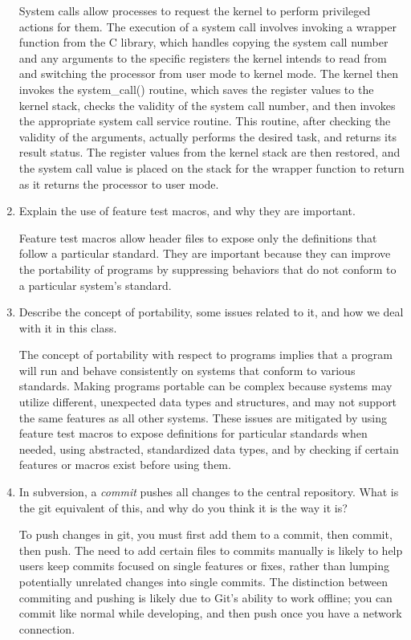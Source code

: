 \documentclass[letterpaper,10pt,onecolumn,titlepage]{article}
\begin{document}
\begin{enumerate}[itemsep=0.1 in]
System calls allow processes to request the kernel to perform privileged actions for them. The execution of a system call involves invoking a wrapper function from the C library, which handles copying the system call number and any arguments to the specific registers the kernel intends to read from and switching the processor from user mode to kernel mode.  The kernel then invokes the system\_call() routine, which saves the register values to the kernel stack, checks the validity of the system call number, and then invokes the appropriate system call service routine.  This routine, after checking the validity of the arguments, actually performs the desired task, and returns its result status.  The register values from the kernel stack are then restored, and the system call value is placed on the stack for the wrapper function to return as it returns the processor to user mode.

\item Explain the use of feature test macros, and why they are important.

Feature test macros allow header files to expose only the definitions that follow a particular standard.  They are important because they can improve the portability of programs by suppressing behaviors that do not conform to a particular system's standard.

\item Describe the concept of portability, some issues related to it, and how we deal
  with it in this class.

  The concept of portability with respect to programs implies that a program will run and behave consistently on systems that conform to various standards.  Making programs portable can be complex because systems may utilize different, unexpected data types and structures, and may not support the same features as all other systems.  These issues are mitigated by using feature test macros to expose definitions for particular standards when needed, using abstracted, standardized data types, and by checking if certain features or macros exist before using them.

\item In subversion, a \emph{commit} pushes all changes to the central repository. What
  is the git equivalent of this, and why do you think it is the way it is?

  To push changes in git, you must first add them to a commit, then commit, then push.  The need to add certain files to commits manually is likely to help users keep commits focused on single features or fixes, rather than lumping potentially unrelated changes into single commits.  The distinction between commiting and pushing is likely due to Git's ability to work offline; you can commit like normal while developing, and then push once you have a network connection.


\end{enumerate}
\end{document}
